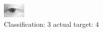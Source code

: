 \begin{figure}[h!]
\begin{center}
\includegraphics[width=0.60\columnwidth]{figures/ID2629_class_3_target_4.png}
\end{center}
\caption{ Classification: 3 actual target: 4}
\label{fig:ID2629_class_3_target_4}
\end{figure}
